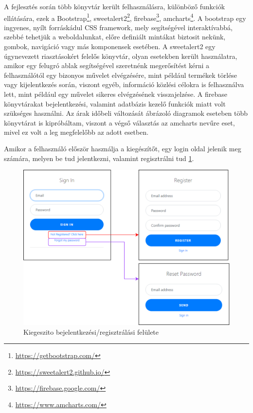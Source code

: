 A fejlesztés során több könyvtár került felhasználásra, különböző funkciók ellátására, ezek a Bootstrap\footnote{\url{https://getbootstrap.com/}}, sweetalert2\footnote{\url{https://sweetalert2.github.io/}}, firebase\footnote{\url{https://firebase.google.com/}}, amcharts\footnote{\url{https://www.amcharts.com/}}. A bootstrap egy ingyenes, nyílt forráskádul CSS framework, mely segítségével interaktívabbá, szebbé tehetjük a weboldalunkat, előre definiált mintákat biztosit nekünk, gombok, navigáció vagy más komponensek esetében. A sweetalert2 egy úgynevezett riasztásokért felelős könyvtár, olyan esetekben került használatra, amikor egy felugró ablak segítségével szeretnénk megerősítést kérni a felhasználótól egy bizonyos művelet elvégzésére, mint például termékek törlése vagy kijelentkezés során, viszont egyéb, információ közlési célokra is felhasználva lett, mint például egy művelet sikeres elvégzésének visszajelzése. A firebase könyvtárakat bejelentkezési, valamint adatbázis kezelő funkciók miatt volt szükséges használni. Az árak időbeli változását ábrázoló diagramok eseteben több könyvtárat is kipróbáltam, viszont a végső választás az amcharts nevűre eset, mivel ez volt a leg megfelelőbb az adott esetben.

Amikor a felhasználó először használja a kiegészítőt, egy login oldal jelenik meg számára, melyen be tud jelentkezni, valamint regisztrálni tud \ref{fig:ext_login_reg}.

\begin{figure}[H]
    \centering
    \includegraphics[scale=1]{figures/images/login-reg-ext.png}
    \caption{Kiegeszito bejelentkezési/regisztrálási felülete}
    \label{fig:ext_login_reg}
\end{figure}

